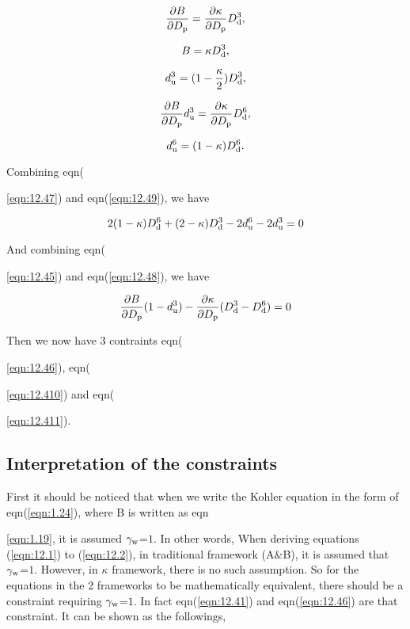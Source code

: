 \documentclass[12pt]{article}
\begin{document}
{{{{\begin{equation}\label{eqn:12.45}
\frac{\partial B}{\partial D_{\rm p}}=\frac{\partial \kappa}{\partial D_{\rm p}} D_{\rm d}^{3},
\end{equation}


\begin{equation}\label{eqn:12.46}
B=\kappa D_{\rm d}^{3},
\end{equation}

\begin{equation}\label{eqn:12.47}
d_{\rm u}^{3}=(1-\frac{\kappa}{2}) D_{\rm d}^{3}, 
\end{equation}

\begin{equation}\label{eqn:12.48}
\frac{\partial B}{\partial D_{\rm p}} d_{\rm u}^{3} = \frac{\partial \kappa}{\partial D_{\rm p}} D_{\rm d}^{6},
\end{equation}

\begin{equation}\label{eqn:12.49}
d_{\rm u}^{6}=(1-\kappa) D_{\rm d}^{6}.
\end{equation}

Combining eqn({\ref{eqn:12.47}) and eqn(\ref{eqn:12.49}), we have

\begin{equation}\label{eqn:12.410}
2(1-\kappa) D_{\rm d}^{6}+(2-\kappa)D_{\rm d}^{3}-2d_{\rm u}^{6}-2d_{\rm u}^{3}=0
\end{equation}

And combining eqn({\ref{eqn:12.45}) and eqn(\ref{eqn:12.48}), we have

\begin{equation}\label{eqn:12.411}
\frac{\partial B}{\partial D_{\rm p}}(1-d_{\rm u}^{3})-  \frac{\partial \kappa}{\partial D_{\rm p}} (D_{\rm d}^{3}-D_{\rm d}^{6})=0
\end{equation}

Then we now have 3 contraints eqn({\ref{eqn:12.46}),  eqn({\ref{eqn:12.410}) and eqn({\ref{eqn:12.411}).


\subsection{Interpretation of the constraints} 

First it should be noticed that when we write the Kohler equation in the form of eqn(\ref{eqn:1.24}), where B is written as eqn{\ref{eqn:1.19}, it is assumed $\gamma_{\rm w}$=$1$. In other words, When deriving equations (\ref{eqn:12.1}) to (\ref{eqn:12.2}), in traditional framework (A$\&$B), it is assumed that $\gamma_{\rm w}$=$1$. However, in $\kappa$ framework, there is no such assumption. So for the equations in the 2 frameworks to be mathematically equivalent, there should be a constraint requiring $\gamma_{\rm w}$=$1$. In fact eqn(\ref{eqn:12.41}) and eqn(\ref{eqn:12.46}) are that constraint. It can be shown as the followings,


}}}}}}}}}}
\end{document}
